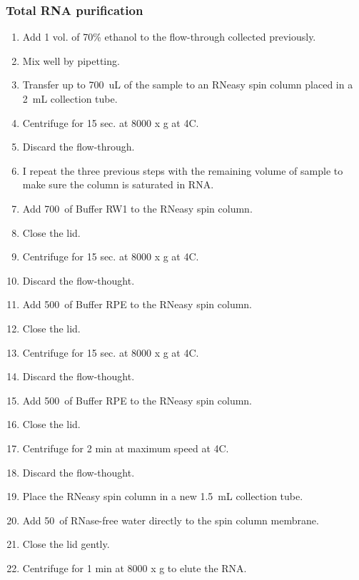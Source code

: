 \subsubsection{Total RNA purification}

\begin{enumerate}
\item Add 1 vol. of 70\% ethanol to the flow-through collected previously. 
\item Mix well by pipetting.
\item Transfer up to 700~uL of the sample to an RNeasy spin column placed in a 2~mL collection tube.
\item Centrifuge for 15 sec. at 8000 x g at 4\degree C.
\item Discard the flow-through.
\item I repeat the three previous steps with the remaining volume of sample to make sure the column is saturated in RNA.
\item Add 700~\uL of Buffer RW1 to the RNeasy spin column.
\item Close the lid.
\item Centrifuge for 15 sec. at 8000 x g at 4\degree C.
\item Discard the flow-thought.
\item Add 500~\uL of Buffer RPE to the RNeasy spin column.
\item Close the lid.
\item Centrifuge for 15 sec. at 8000 x g at 4\degree C.
\item Discard the flow-thought.
\item Add 500~\uL of Buffer RPE to the RNeasy spin column.
\item Close the lid.
\item Centrifuge for 2 min at maximum speed at 4\degree C.
\item Discard the flow-thought.
\item Place the RNeasy spin column in a new 1.5~mL collection tube.
\item Add 50~\uL of RNase-free water directly to the spin column membrane. 
\item Close the lid gently.
\item Centrifuge for 1 min at 8000 x g to elute the RNA.
\end{enumerate}

